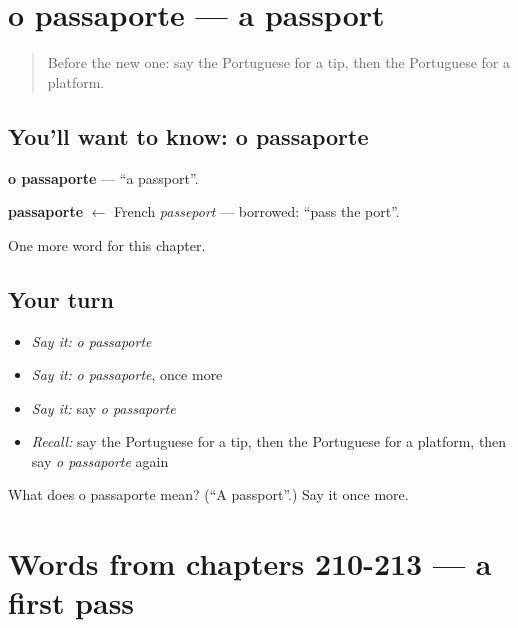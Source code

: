\section[o passaporte]{o passaporte — a passport}

\label{lesson:PT-C218-passaporte}



\begin{quote}
Before the new one: say the Portuguese for a tip, then the Portuguese for a platform.
\end{quote}

\subsection*{You'll want to know: o passaporte}
\textbf{o passaporte} — \textquotedblleft{}a passport\textquotedblright{}.

\begin{cousinweb}
\textbf{passaporte} $\leftarrow$ French \emph{passeport} — borrowed: \textquotedblleft{}pass the port\textquotedblright{}.
\end{cousinweb}

\begin{grammarlens}[title={What you've built}]
One more word for this chapter.
\end{grammarlens}

\subsection*{Your turn}
\begin{itemize}
\raggedright
  \item \emph{Say it:} \emph{o passaporte}
  \item \emph{Say it:} \emph{o passaporte}, once more
  \item \emph{Say it:} say \emph{o passaporte}
  \item \emph{Recall:} say the Portuguese for a tip, then the Portuguese for a platform, then say \emph{o passaporte} again
\end{itemize}

\begin{tcolorbox}[breakable,colback=teal!4,colframe=teal!35!black,title={Before you move on}]
What does o passaporte mean? (\textquotedblleft{}A passport\textquotedblright{}.) Say it once more.
\end{tcolorbox}
\section[(dialogue)]{Words from chapters 210-213 — a first pass}

